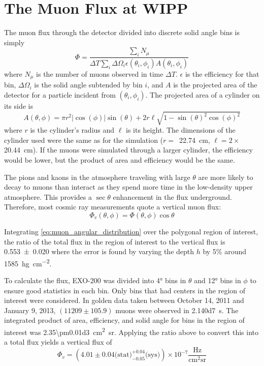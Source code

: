 \documentclass[herrin-thesis.tex]{subfiles}
\begin{document}
\section{The Muon Flux at WIPP}
\label{sec:muon_wipp}
The muon flux through the detector divided into discrete solid angle bins is simply
\begin{equation}
\label{eq:muon_fluxdef}
\Phi = \frac{\sum_{i}N_{\mu}}{ \Delta T\sum_{i}\Delta\Omega_i \epsilon(\theta_i, \phi_i) A(\theta_i, \phi_i)}
\end{equation}
where \(N_\mu\) is the number of muons observed in time \(\Delta T\). \(\epsilon\) is the efficiency for that bin, \(\Delta\Omega_i\) is the solid angle subtended by bin \(i\), and \(A\) is the projected area of the detector for a particle incident from \((\theta_i, \phi_i)\). The projected area of a cylinder on its side is
\begin{equation}
A(\theta,\phi) = \pi r^2 |\cos(\phi)|\sin(\theta) + 2 r \ell \sqrt{1-\sin(\theta)^2 \cos(\phi)^2}
\end{equation}
where \(r\) is the cylinder's radius and \(\ell\) is its height. The dimensions of the cylinder used were the same as for the simulation (\(r =\)~\SI{22.74}{\cm}, \(\ell=2\times\)\SI{20.44}{\cm}). If the muons were simulated through a larger cylinder, the efficiency would be lower, but the product of area and efficiency would be the same.

The pions and kaons in the atmosphere traveling with large \(\theta\) are more likely to decay to muons than interact as they spend more time in the low-density upper atmosphere. This provides a \(\sec\theta\) enhancement in the flux underground. Therefore, most cosmic ray measurements quote a vertical muon flux:
\begin{equation}
\label{eq:muon_vfluxdef}
\Phi_v(\theta, \phi) = \Phi(\theta, \phi)\cos\theta
\end{equation}

Integrating \cref{eq:muon_angular_distribution} over the polygonal region of interest, the ratio of the total flux in the region of interest to the vertical flux is \num{0.553\pm0.020} where the error is found by varying the depth \(h\) by 5\% around \SI{1585}{\hecto\g\per\square\cm}.

To calculate the flux, EXO-200 was divided into \ang{4} bins in \(\theta\) and \ang{12} bins in \(\phi\) to ensure good statistics in each bin. Only bins that had centers in the region of interest were considered. In golden data taken between October 14, 2011 and January 9, 2013, \((11209\pm105.9)\) muons were observed in \SI{2.140d7}{\second}. The integrated product of area, efficiency, and solid angle for bins in the region of interest was \SI{2.35\pm0.01d3}{\square\cm\steradian}. Applying the ratio above to convert this into a total flux yields a vertical flux of
\begin{equation}
\label{eq:muon_vflux_result}
\Phi_v = \left(4.01\pm0.04\text{(stat)}^{+0.04}_{-0.05}\text{(sys)}\right)\times10^{-7}\frac{\text{Hz}}{\text{cm}^2\text{sr}}
\end{equation}
\end{document}
